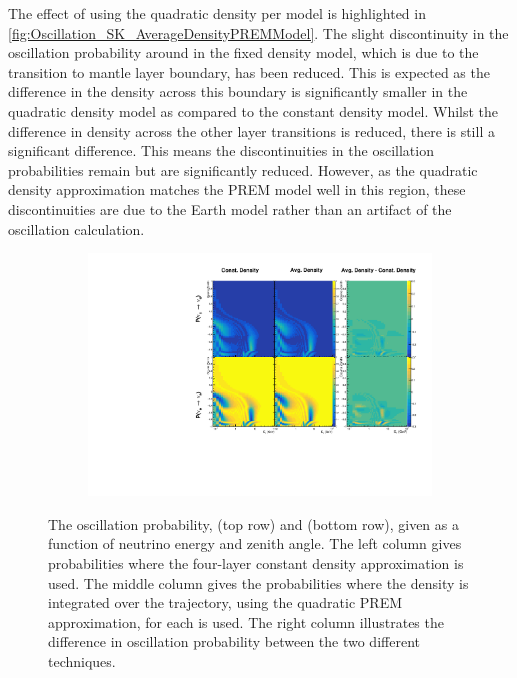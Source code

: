 The effect of using the quadratic density per  model is highlighted in \autoref{fig:Oscillation_SK_AverageDensityPREMModel}. The slight discontinuity in the oscillation probability around  in the fixed density model, which is due to the transition to mantle layer boundary, has been reduced. This is expected as the difference in the density across this boundary is significantly smaller in the quadratic density model as compared to the constant density model. Whilst the difference in density across the other layer transitions is reduced, there is still a significant difference. This means the discontinuities in the oscillation probabilities remain but are significantly reduced. However, as the quadratic density approximation matches the PREM model well in this region, these discontinuities are due to the Earth model rather than an artifact of the oscillation calculation.

\begin{figure}[h]
  \begin{subfigure}[t]{\textwidth}
    \includegraphics[width=\textwidth, trim={0mm 0mm 0mm 0mm}, clip,page=1]{Figures/Oscillation/AverageDensityPREMModel.pdf}
  \end{subfigure}
  \caption{The oscillation probability,  (top row) and  (bottom row), given as a function of neutrino energy and zenith angle. The left column gives probabilities where the four-layer constant density approximation is used. The middle column gives the probabilities where the density is integrated over the trajectory, using the quadratic PREM approximation, for each  is used. The right column illustrates the difference in oscillation probability between the two different techniques.}
  \label{fig:Oscillation_SK_AverageDensityPREMModel}
\end{figure}

